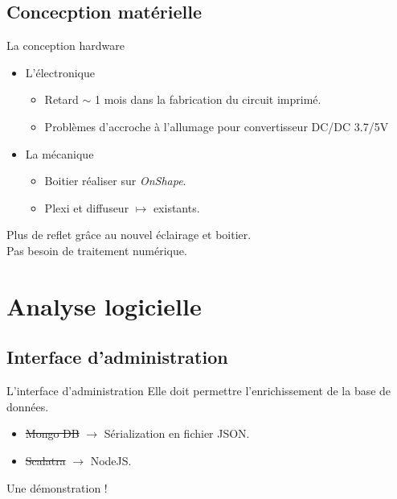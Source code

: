 \documentclass{beamer}
\begin{document}
\subsection{Concecption matérielle}
\begin{frame}{La conception hardware}
 \begin{itemize}
     \item L'électronique
     \begin{itemize}
         \item Retard $\sim$ 1 mois dans la fabrication du circuit imprimé.
         \item Problèmes d'accroche à l'allumage pour convertisseur DC/DC 3.7/5V
     \end{itemize}
     \item La mécanique
     \begin{itemize}
         \item Boitier réaliser sur \emph{OnShape}.
         \item Plexi et diffuseur $\mapsto$ existants.
     \end{itemize}
 \end{itemize}
 
 \begin{block}{}
Plus de reflet grâce au nouvel éclairage et boitier.\\
Pas besoin de traitement numérique.
\end{block}
  
\end{frame}

\section{Analyse logicielle}
\subsection{Interface d'administration}
\begin{frame}{L'interface d'administration}
Elle doit permettre l'enrichissement de la base de données.
\begin{itemize}
    \item \st{Mongo DB} $\rightarrow$ Sérialization en fichier JSON.
    \item \st{Scalatra} $\rightarrow$ NodeJS.
\end{itemize}

\begin{block}{}
Une démonstration !
\end{block}

\end{frame}
\end{document}
